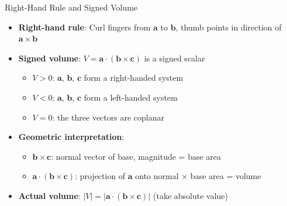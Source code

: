 \begin{frame}{Right-Hand Rule and Signed Volume}
    \begin{itemize}
        \setlength{\itemsep}{0.6em}
        \setlength{\parskip}{0.2em}
        \item \textbf{Right-hand rule}: Curl fingers from $\mathbf{a}$ to $\mathbf{b}$, thumb points in direction of $\mathbf{a} \times \mathbf{b}$
        \item \textbf{Signed volume}: $V = \mathbf{a} \cdot (\mathbf{b} \times \mathbf{c})$ is a signed scalar
        \begin{itemize}
            \item $V > 0$: $\mathbf{a}$, $\mathbf{b}$, $\mathbf{c}$ form a right-handed system
            \item $V < 0$: $\mathbf{a}$, $\mathbf{b}$, $\mathbf{c}$ form a left-handed system
            \item $V = 0$: the three vectors are coplanar
        \end{itemize}
        \item \textbf{Geometric interpretation}:
        \begin{itemize}
            \item $\mathbf{b} \times \mathbf{c}$: normal vector of base, magnitude = base area
            \item $\mathbf{a} \cdot (\mathbf{b} \times \mathbf{c})$: projection of $\mathbf{a}$ onto normal $\times$ base area = volume
        \end{itemize}
        \item \textbf{Actual volume}: $|V| = |\mathbf{a} \cdot (\mathbf{b} \times \mathbf{c})|$ (take absolute value)
    \end{itemize}
\end{frame}

